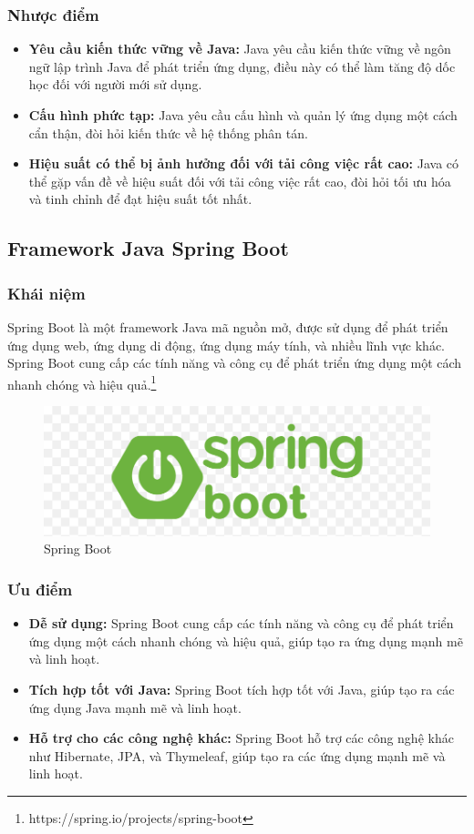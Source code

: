 \subsubsection{Nhược điểm}
\begin{itemize}
  \item \textbf{Yêu cầu kiến thức vững về Java:} Java yêu cầu kiến thức vững về ngôn ngữ lập trình Java để phát triển ứng dụng, điều này có thể làm tăng độ dốc học đối với người mới sử dụng.
  \item \textbf{Cấu hình phức tạp:} Java yêu cầu cấu hình và quản lý ứng dụng một cách cẩn thận, đòi hỏi kiến thức về hệ thống phân tán.
  \item \textbf{Hiệu suất có thể bị ảnh hưởng đối với tải công việc rất cao:} Java có thể gặp vấn đề về hiệu suất đối với tải công việc rất cao, đòi hỏi tối ưu hóa và tinh chỉnh để đạt hiệu suất tốt nhất.
\end{itemize}
\subsection{Framework Java Spring Boot}
\subsubsection{Khái niệm}
\noindent Spring Boot là một framework Java mã nguồn mở, được sử dụng để phát triển ứng dụng web, ứng dụng di động, ứng dụng máy tính, và nhiều lĩnh vực khác. Spring Boot cung cấp các tính năng và công cụ để phát triển ứng dụng một cách nhanh chóng và hiệu quả.\footnote{https://spring.io/projects/spring-boot}
\begin{figure}[H]
  \begin{center}
    \includegraphics[scale=0.3]{images/hieu/phuluc/spring-boot.png}
    \caption{Spring Boot}
  \end{center}
\end{figure}
\subsubsection{Ưu điểm}
\begin{itemize}
  \item \textbf{Dễ sử dụng:} Spring Boot cung cấp các tính năng và công cụ để phát triển ứng dụng một cách nhanh chóng và hiệu quả, giúp tạo ra ứng dụng mạnh mẽ và linh hoạt.
  \item \textbf{Tích hợp tốt với Java:} Spring Boot tích hợp tốt với Java, giúp tạo ra các ứng dụng Java mạnh mẽ và linh hoạt.
  \item \textbf{Hỗ trợ cho các công nghệ khác:} Spring Boot hỗ trợ các công nghệ khác như Hibernate, JPA, và Thymeleaf, giúp tạo ra các ứng dụng mạnh mẽ và linh hoạt.
\end{itemize}
